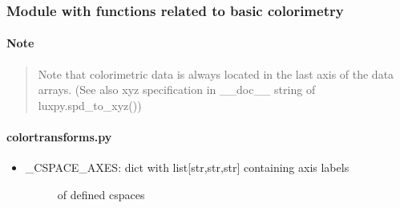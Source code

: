 \documentclass[letterpaper,10pt,english]{sphinxmanual}
\begin{document}
\subsubsection{Module with functions related to basic colorimetry}
\label{\detokenize{color:module-with-functions-related-to-basic-colorimetry}}

\paragraph{Note}
\label{\detokenize{color:note}}\begin{quote}

Note that colorimetric data is always located in the last axis
of the data arrays. (See also xyz specification in \_\_doc\_\_ string
of luxpy.spd\_to\_xyz())
\end{quote}


\paragraph{colortransforms.py}
\label{\detokenize{color:colortransforms-py}}\begin{itemize}
\item {} \begin{description}
\item[{\_CSPACE\_AXES: dict with list{[}str,str,str{]} containing axis labels}] \leavevmode
of defined cspaces

\end{description}

\end{itemize}
\end{document}
